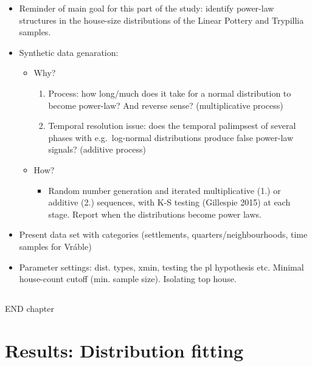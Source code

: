 \documentclass[
  12pt,
]{book}
\providecommand{\tightlist}{%
  \setlength{\itemsep}{0pt}\setlength{\parskip}{0pt}}
\begin{document}
\begin{itemize}
\item
  Reminder of main goal for this part of the study: identify power-law structures in the house-size distributions of the Linear Pottery and Trypillia samples.
\item
  Synthetic data genaration:

  \begin{itemize}
  \item
    Why?

    \begin{enumerate}
    \def\labelenumi{\arabic{enumi}.}
    \item
      Process: how long/much does it take for a normal distribution to become power-law? And reverse sense? (multiplicative process)
    \item
      Temporal resolution issue: does the temporal palimpsest of several phases with e.g.~log-normal distributions produce false power-law signals? (additive process)
    \end{enumerate}
  \item
    How?

    \begin{itemize}
    \tightlist
    \item
      Random number generation and iterated multiplicative (1.) or additive (2.) sequences, with K-S testing (Gillespie 2015) at each stage. Report when the distributions become power laws.
    \end{itemize}
  \end{itemize}
\item
  Present data set with categories (settlements, quarters/neighbourhoods, time samples for Vráble)
\item
  Parameter settings: dist. types, xmin, testing the pl hypothesis etc. Minimal house-count cutoff (min. sample size). Isolating top house.
\end{itemize}

\hypertarget{section}{%
\section{}\label{section}}

END chapter

\hypertarget{results-distfit}{%
\chapter{Results: Distribution fitting}\label{results-distfit}}
\end{document}
